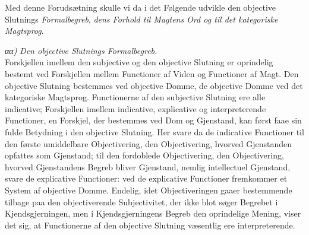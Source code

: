 \documentclass[12pt]{book}
\newcommand{\opage}[1]{\marginnote{\footnotesize\textit{[#1]}}}
\begin{document}
Med denne Forudsætning skulle vi da i det Følgende udvikle den objective Slutnings \emph{Formalbegreb}, \emph{dens Forhold til Magtens Ord og til det kategoriske Magtsprog}.

\noindent\textit{αα)} \emph{Den objective Slutnings Formalbegreb.}\\
Forskjellen imellem den subjective og den objective Slutning er oprindelig bestemt ved Forskjellen mellem Functioner af Viden og Functioner af Magt. Den objective Slutning bestemmes ved objective Domme, de objective Domme ved det kategoriske Magtsprog. Functionerne af den subjective Slutning ere alle indicative; Forskjellen imellem indicative, explicative og interpreterende Functioner, en Forskjel, der bestemmes ved Dom og Gjenstand, kan først faae sin fulde Betydning i den objective Slutning. Her svare da de indicative Functioner
\opage{391}til den første umiddelbare Objectivering, den Objectivering, hvorved Gjenstanden opfattes som Gjenstand; til den fordoblede Objectivering, den Objectivering, hvorved Gjenstandens Begreb bliver Gjenstand, nemlig intellectuel Gjenstand, svare de explicative Functioner: ved de explicative Functioner fremkommer et System af objective Domme. Endelig, idet Objectiveringen gaaer bestemmende tilbage paa den objectiverende Subjectivitet, der ikke blot søger Begrebet i Kjendsgjerningen, men i Kjendsgjerningens Begreb den oprindelige Mening, viser det sig, at Functionerne af den objective Slutning væsentlig ere interpreterende.
\end{document}

